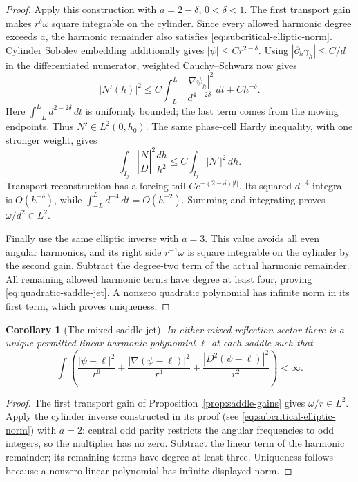 \documentclass[reqno,11pt]{amsart}
\numberwithin{equation}{section}
\newtheorem{corollary}[theorem]{Corollary}
\theoremstyle{remark}
\begin{document}
\begin{proof}
Apply this construction with $a=2-\delta$, $0<\delta<1$.
The first transport gain makes $r^\delta\omega$ square integrable
on the cylinder.  Since every allowed harmonic degree exceeds
$a$, the harmonic remainder also satisfies
\eqref{eq:subcritical-elliptic-norm}.  Cylinder Sobolev embedding
additionally gives $|\psi|\leq Cr^{2-\delta}$.
Using $|\partial_h\gamma_h|\leq C/d$ in the differentiated
numerator, weighted Cauchy--Schwarz now gives
\[
 |N'(h)|^2\leq
 C\int_{-L}^L\frac{|\nabla\psi_h|^2}{d^{4-2\delta}}\,dt
       +Ch^{-\delta}.
\]
Here $\int_{-L}^Ld^{2-2\delta}\,dt$ is uniformly bounded;
the last term comes from the moving endpoints.
Thus $N'\in L^2(0,h_0)$.  The same phase-cell Hardy inequality,
with one stronger weight, gives
\[
 \int_{I_j}\left|\frac ND\right|^2\frac{dh}{h^2}
       \leq C\int_{I_j}|N'|^2\,dh.
\]
Transport reconstruction has a forcing tail
$Ce^{-(2-\delta)|t|}$.  Its squared $d^{-4}$ integral is
$O(h^{-\delta})$, while $\int_{-L}^Ld^{-4}\,dt=O(h^{-2})$.
Summing and integrating proves $\omega/d^2\in L^2$.

Finally use the same elliptic inverse with $a=3$.  This value
avoids all even angular harmonics, and its right side
$r^{-1}\omega$ is square integrable on the cylinder by the
second gain.  Subtract the degree-two term of the actual harmonic
remainder.  All remaining allowed harmonic terms have degree at
least four, proving \eqref{eq:quadratic-saddle-jet}.
A nonzero quadratic polynomial has infinite norm in its first
term, which proves uniqueness.
\end{proof}

\begin{corollary}[The mixed saddle jet]\label{cor:mixed-saddle-jet}
In either mixed reflection sector there is a unique permitted linear
harmonic polynomial $\ell$ at each saddle such that
\[
 \int\left(\frac{|\psi-\ell|^2}{r^6}
 +\frac{|\nabla(\psi-\ell)|^2}{r^4}
 +\frac{|D^2(\psi-\ell)|^2}{r^2}\right)<\infty.
\]
\end{corollary}
\begin{proof}
The first transport gain of Proposition~\ref{prop:saddle-gains}
gives $\omega/r\in L^2$.
Apply the cylinder inverse constructed in its proof
(see \eqref{eq:subcritical-elliptic-norm}) with $a=2$: central odd parity
restricts the angular frequencies to odd integers, so the multiplier
has no zero. Subtract the linear term of the harmonic remainder;
its remaining terms have degree at least three. Uniqueness follows
because a nonzero linear polynomial has infinite displayed norm.
\end{proof}
\end{document}
